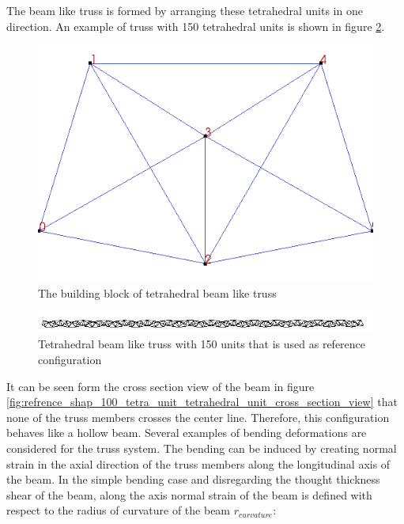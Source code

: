The beam like truss is formed by arranging these tetrahedral units in one direction. An example of truss with 150 tetrahedral units is shown in figure \ref{fig:refrence_shap_100_tetra_unit_tetrahedral_unit}. 
\begin{figure} 
\centering
\includegraphics[width=6.0in]{./chap_5_active_trusses/images_linear_tetrahedral/building_block_of_tetrahedral_truss.png}
\caption{The building block of tetrahedral beam like truss}
\label{fig:building_block_of_tetrahedral_truss}
\end{figure} 

\begin{figure} 
\centering
\includegraphics[width=6.0in]{./chap_5_active_trusses/images_linear_tetrahedral/refrence_shap_100_tetra_unit_tetrahedral_unit.png}
\caption{Tetrahedral beam like truss with 150 units that is used as reference configuration}
\label{fig:refrence_shap_100_tetra_unit_tetrahedral_unit}
\end{figure} 
It can be seen form the cross section view of the beam in figure \ref{fig:refrence_shap_100_tetra_unit_tetrahedral_unit_cross_section_view} that none of the truss members crosses the center line. Therefore, this configuration behaves like a hollow beam. Several examples of bending deformations are considered for the truss system. The bending can be induced by creating normal strain in the axial direction of the truss members along the longitudinal axis of the beam. In the simple bending case and disregarding the thought thickness shear of the beam, along the axis normal strain of the beam is defined with respect to the radius of curvature of the beam $r_{curvature}$:

